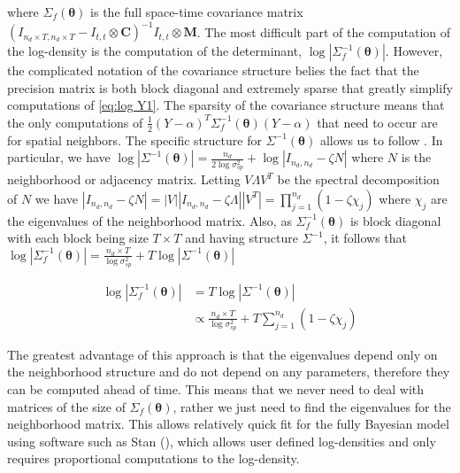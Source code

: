 \documentclass[11pt]{isuthesis}
\begin{document}
where $\Sigma_f(\boldsymbol{\theta})$ is the full space-time covariance matrix $\left(I_{n_d \times T,n_d \times T}-I_{t,t}\otimes \boldsymbol{C}\right)^{-1}I_{t,t}\otimes \boldsymbol{M}$.  The most difficult part of the computation of the log-density is the computation of the determinant, $\log | \Sigma_f^{-1}(\boldsymbol{\theta})|$.  However, the complicated notation of the covariance structure belies the fact that the precision matrix is both block diagonal and extremely sparse that greatly simplify computations of \eqref{eq:log Y1}.  The sparsity of the covariance structure means that the only computations of $\frac{1}{2}(Y-\alpha)^T\Sigma_f^{-1}(\boldsymbol{\theta})(Y-\alpha)$ that need to occur are for spatial neighbors.  The specific structure for $\Sigma^{-1}(\boldsymbol{\theta})$ allows us to follow \cite{jin2005generalized}.  In particular, we have $\log|\Sigma^{-1}(\boldsymbol{\theta})|=\frac{n_d}{2\log\sigma_{sp}^2}+\log|I_{n_d,n_d}-\zeta N|$ where $N$ is the neighborhood or adjacency matrix.  Letting $V \Lambda V^T$ be the spectral decomposition of $N$ we have $|I_{n_d,n_d}-\zeta N|=|V| |I_{n_d,n_d}-\zeta \Lambda| |V^T|=\prod_{j=1}^{n_d}\left(1-\zeta \chi_j\right)$ where $\chi_j$ are the eigenvalues of the neighborhood matrix.  Also, as $ \Sigma_f^{-1}(\boldsymbol{\theta})$ is block diagonal with each block being size $T \times T$ and having structure $\Sigma^{-1}$, it follows that $\log| \Sigma_f^{-1}(\boldsymbol{\theta})|=\frac{n_d \times T}{\log\sigma_{sp}^2}+T\log| \Sigma^{-1}(\boldsymbol{\theta})|$

\begin{align}
	\log | \Sigma_f^{-1}(\boldsymbol{\theta})|&  = T \log | \Sigma^{-1}(\boldsymbol{\theta})|\\
	& \propto \frac{n_d \times T}{\log\sigma_{sp}^2}+ T \sum_{j=1}^{n_d}(1-\zeta\chi_j) \label{eq:eig}
\end{align}

The greatest advantage of this approach is that the eigenvalues depend only on the neighborhood structure and do not depend on any parameters, therefore they can be computed ahead of time.  This means that we never need to deal with matrices of the size of  $\Sigma_f(\boldsymbol{\theta})$, rather we just need to find the eigenvalues for the neighborhood matrix.  This allows relatively quick fit for the fully Bayesian model using software such as Stan (\cite{carpenter2016stan}), which allows user defined log-densities and only requires proportional computations to the log-density. 
\end{document}
